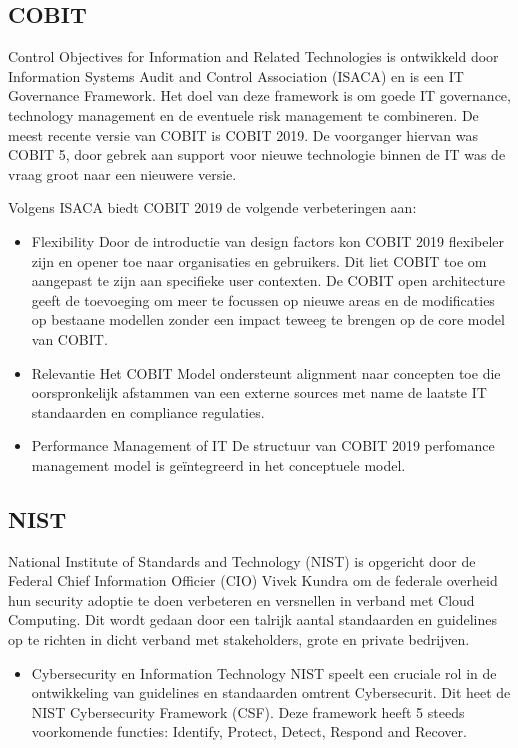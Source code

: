 \subsection{COBIT}
Control Objectives for Information and Related Technologies is ontwikkeld door Information Systems Audit and Control Association (ISACA) en is een IT Governance Framework. Het doel van deze framework is om goede IT governance, technology management en de eventuele risk management te combineren. \autocite{Khther2013} 
De meest recente versie van COBIT is COBIT 2019. De voorganger hiervan was COBIT 5, door gebrek aan support voor nieuwe technologie binnen de IT was de vraag groot naar een nieuwere versie.

Volgens ISACA biedt COBIT 2019 de volgende verbeteringen aan:

\begin{itemize}
    \item Flexibility
    Door de introductie van design factors kon COBIT 2019 flexibeler zijn en opener toe naar organisaties en gebruikers. Dit liet COBIT toe om aangepast te zijn aan specifieke user contexten. De COBIT open architecture geeft de toevoeging om meer te focussen op nieuwe areas en de modificaties op bestaane modellen zonder een impact teweeg te brengen op de core model van COBIT. \autocite{Mikkola2021}
    \item Relevantie
    Het COBIT Model ondersteunt alignment naar concepten toe die oorspronkelijk afstammen van een externe sources met name de laatste IT standaarden en compliance regulaties. \autocite{Khther2013}
    \item Performance Management of IT 
    De structuur van COBIT 2019 perfomance management model is geïntegreerd in het conceptuele model.
\end{itemize}

\subsection{NIST}
National Institute of Standards and Technology (NIST) is opgericht door de Federal Chief Information Officier (CIO) Vivek Kundra om de federale overheid hun security adoptie te doen verbeteren en versnellen in verband met Cloud Computing.
Dit wordt gedaan door een talrijk aantal standaarden en guidelines op te richten in dicht verband met stakeholders, grote en private bedrijven. \autocite{Hogan2011}

\begin{itemize}
     \item Cybersecurity en Information Technology
     NIST speelt een cruciale rol in de ontwikkeling van guidelines en standaarden omtrent Cybersecurit. Dit heet de NIST Cybersecurity Framework (CSF).
     Deze framework heeft 5 steeds voorkomende functies: Identify, Protect, Detect, Respond and Recover. \autocite{Ibrahim2018}
\end{itemize}